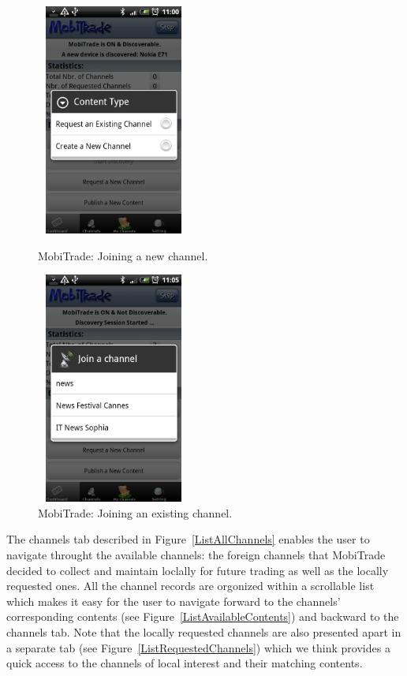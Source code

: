 \begin{figure}[!h]
\begin{minipage}[l]{0.3\linewidth}
\centering
\includegraphics[width=2in,height=3in]{Chapitre6/JoinChannel.png}
\begin{minipage}[l]{1\linewidth}
\small
\caption{MobiTrade: Joining a new channel.}
\normalsize
\label{JoiningNewChannel}
\end{minipage}
\end{minipage}
\hspace{2.1cm}
\begin{minipage}[l]{0.3\linewidth}
\centering
\includegraphics[width=2in,height=3in]{Chapitre6/JoinExistingChannel.png}
\begin{minipage}[l]{1\linewidth}
\caption{MobiTrade: Joining an existing channel.}
\label{JoiningExistingChannel}
\end{minipage}
\end{minipage}
\end{figure}

The channels tab described in Figure~\ref{ListAllChannels} enables the user to navigate throught the available channels: the foreign channels that MobiTrade decided to collect and maintain loclally for future trading as well as the locally requested ones. All the channel records are orgonized within a scrollable list which makes it easy for the user to navigate forward to the channels' corresponding contents (see Figure~\ref{ListAvailableContents}) and backward to the channels tab. Note that the locally requested channels are also presented apart in a separate tab (see Figure~\ref{ListRequestedChannels}) which we think provides a quick access to the channels of local interest and their matching contents.

